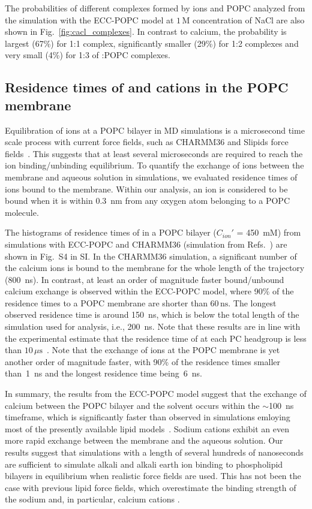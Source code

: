 \documentclass[journal=jpcbfk,manuscript=article]{achemso}
\begin{document}
The probabilities of different complexes formed by  ions and POPC
analyzed from the simulation with the ECC-POPC model at $1\,$M concentration of NaCl are also 
shown in Fig.~\ref{fig:cacl_complexes}. In contrast to calcium, the
probability is largest (67\%) for 1:1 complex, significantly smaller (29\%)
for 1:2 complexes and very small (4\%) for 1:3 of :POPC complexes.




\subsection{Residence times of  and  cations in the POPC membrane}

Equilibration of  ions at a POPC bilayer in MD simulations is a microsecond time scale process with current force fields, such  as CHARMM36 and Slipids force fields~\cite{javanainen17}. This suggests that at least several microseconds are required to reach the ion binding/unbinding equilibrium.
To quantify the exchange of ions between the membrane and aqueous solution in simulations, we evaluated residence times of ions bound to the membrane. Within our analysis, an ion is considered to be bound when it is within 0.3~nm from any oxygen atom belonging to a POPC molecule.

The histograms of residence times of  in a POPC bilayer ($C_{ion}'$ = 450~mM) from simulations with 
ECC-POPC and CHARMM36 (simulation from Refs.~) are shown in Fig.~S4 in SI.
In the CHARMM36 simulation, a significant number of the calcium ions is bound to the membrane for the whole length of the trajectory (800~ns).
In contrast, at least an order of magnitude faster bound/unbound calcium exchange is observed within the ECC-POPC model,
where 90\% of the  residence times to a POPC membrane are shorter than $60\,\mathrm{ns}$. The longest observed
residence time is around 150~ns, which is below the total length of the simulation used for analysis, i.e., 200~ns.
Note that these results are in line with the experimental estimate that the residence time of  at each PC
headgroup is less than $10\,\mu\mathrm{s}$~\cite{altenbach84}. Note that the exchange of  ions at the POPC membrane
is yet another order of magnitude faster, with 90\% of the residence times smaller than~1~ns and the longest residence time being~6~ns.

In summary, the results from the ECC-POPC model suggest that the exchange of calcium between the POPC bilayer and the solvent occurs within the $\sim$100~ns timeframe, which is significantly faster than observed in simulations emloying most of the presently available lipid models~\cite{javanainen17}. Sodium cations exhibit an even more rapid exchange between the membrane and the aqueous solution. Our results suggest that simulations with a length of several hundreds of nanoseconds are sufficient to simulate alkali and alkali earth ion binding to phospholipid bilayers in equilibrium when realistic force fields are used. This has not been the case with previous lipid force fields, which overestimate the binding strength of the sodium and, in particular,  calcium cations \cite{javanainen17, catte16}.
\end{document}
